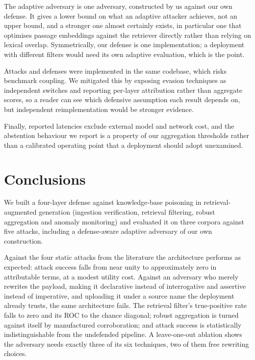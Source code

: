 \documentclass[information,article,submit,moreauthors]{Definitions/mdpi}
\begin{document}
The adaptive adversary is one adversary, constructed by us against our own defense. It gives a
lower bound on what an adaptive attacker achieves, not an upper bound, and a stronger one
almost certainly exists, in particular one that optimises passage embeddings against the
retriever directly rather than relying on lexical overlap. Symmetrically, our defense is one
implementation; a deployment with different filters would need its own adaptive evaluation,
which is the point.

Attacks and defenses were implemented in the same codebase, which risks benchmark coupling. We
mitigated this by exposing evasion techniques as independent switches and reporting per-layer
attribution rather than aggregate scores, so a reader can see which defensive assumption each
result depends on, but independent reimplementation would be stronger evidence.

Finally, reported latencies exclude external model and network cost, and the abstention
behaviour we report is a property of our aggregation thresholds rather than a calibrated
operating point that a deployment should adopt unexamined.

\section{Conclusions}

We built a four-layer defense against knowledge-base poisoning in retrieval-augmented
generation (ingestion verification, retrieval filtering, robust aggregation and anomaly
monitoring) and evaluated it on three corpora against five attacks, including a defense-aware
adaptive adversary of our own construction.

Against the four static attacks from the literature the architecture performs as expected:
attack success falls from near unity to approximately zero in attributable terms, at a modest
utility cost. Against an adversary who merely rewrites the payload, making it declarative
instead of interrogative and assertive instead of imperative, and uploading it under a source
name the deployment already trusts, the same architecture fails. The retrieval filter's true-positive rate falls
to zero and its ROC to the chance diagonal; robust aggregation is turned against itself by
manufactured corroboration; and attack success is statistically indistinguishable from the
undefended pipeline. A leave-one-out ablation shows the adversary needs exactly three of its six
techniques, two of them free rewriting choices.
\end{document}
